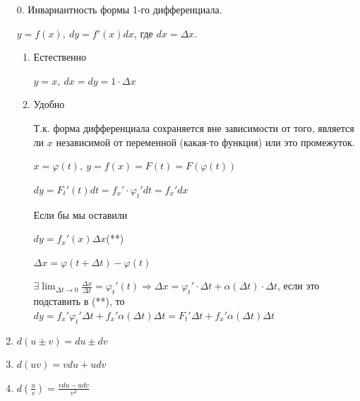 \documentclass{article}
\begin{document}
    \begin{enumerate}
        \item[\(0\).] Инвариантность формы 1-го дифференциала.
        
        \( y = f(x),\ dy = f'(x)dx \), где \( dx = \Delta x \).

        \begin{enumerate}
            \item Естественно
            
            \( y = x,\ dx = dy = 1\cdot \Delta x \)
            
            \item Удобно 
            
            Т.к. форма дифференциала сохраняется вне зависимости от того, является ли \(x\) независимой от переменной (какая-то функция) или это промежуток.

            \( x = \varphi(t),\ y = f(x) = F(t) = F(\varphi(t)) \)

            \( dy = F_t'(t)dt = f_x' \cdot \varphi_t'dt = f_x'dx \)

            Если бы мы оставили 

            \( dy = f_x'(x)\Delta x \)(**)

            \( \Delta x = \varphi(t + \Delta t) - \varphi(t) \)

            \( \exists \lim_{\Delta t \to 0}\frac{\Delta x}{\Delta t} = \varphi_t'(t) \Rightarrow \Delta x = \varphi_t' \cdot \Delta t + \alpha(\Delta t)\cdot\Delta t \), если это подставить в (**), то \( dy = f_x'\varphi_t'\Delta t + f_x'\alpha(\Delta t)\Delta t = F_t'\Delta t + f_x'\alpha(\Delta t)\Delta t \)

        \end{enumerate}

        \item \( d(u \pm v) = du \pm dv \)
        \item \( d(uv) = vdu + udv \) 
        \item \( d(\frac{u}{v}) = \frac{vdu - udv}{v^2} \)


    \end{enumerate}
\end{document}
